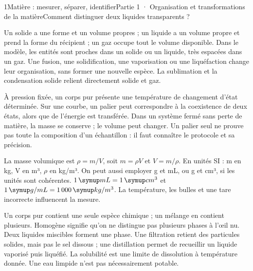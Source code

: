 \begin{ouverture}[college1]{1}{Matière : mesurer, séparer, identifier}{Partie 1 · Organisation et transformations de la matière}{Comment distinguer deux liquides transparents ?}
\end{ouverture}
\label{ess-1}
Un solide a une forme et un volume propres ; un liquide a un volume propre et prend la forme du récipient ; un gaz occupe tout le volume disponible. Dans le modèle, les entités sont proches dans un solide ou un liquide, très espacées dans un gaz. Une fusion, une solidification, une vaporisation ou une liquéfaction change leur organisation, sans former une nouvelle espèce. La sublimation et la condensation solide relient directement solide et gaz.\par
{}
À pression fixée, un corps pur présente une température de changement d’état déterminée. Sur une courbe, un palier peut correspondre à la coexistence de deux états, alors que de l’énergie est transférée. Dans un système fermé sans perte de matière, la masse se conserve ; le volume peut changer. Un palier seul ne prouve pas toute la composition d’un échantillon : il faut connaître le protocole et sa précision.\par
\clearpage
{}
La masse volumique est $\rho=m/V$, soit $m=\rho V$ et $V=m/\rho$. En unités SI : m en kg, V en m³, $\rho$ en kg/m³. On peut aussi employer g et mL, ou g et cm³, si les unités sont cohérentes. $1\unite{mL}=1\unite{cm^3}$ et $1\unite{g/mL}=1\,000\unite{kg/m^3}$. La température, les bulles et une tare incorrecte influencent la mesure.\par
{}
Un corps pur contient une seule espèce chimique ; un mélange en contient plusieurs. Homogène signifie qu’on ne distingue pas plusieurs phases à l’œil nu. Deux liquides miscibles forment une phase. Une filtration retient des particules solides, mais pas le sel dissous ; une distillation permet de recueillir un liquide vaporisé puis liquéfié. La solubilité est une limite de dissolution à température donnée. Une eau limpide n’est pas nécessairement potable.\par
